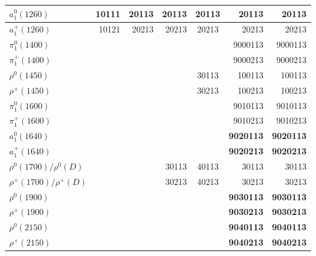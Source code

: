 \begin{tabular}{|l@{\tstrut}|r|r|r|c|r|r|}
$a_1^0(1260)$            & 10111 & 20113 &   20113 & 20113 &    20113 & 20113 \\ \hline
$a_1^+(1260)$            & 10121 & 20213 &   20213 & 20213 &    20213 & 20213 \\ \hline
$\pi_1^0(1400)$          &       &       &         &       &  9000113 & 9000113 \\ \hline
$\pi_1^+(1400)$          &       &       &         &       &  9000213 & 9000213 \\ \hline
$\rho^0(1450)$           &       &       &         & 30113 &   100113 & 100113 \\ \hline
$\rho^+(1450)$           &       &       &         & 30213 &   100213 & 100213 \\ \hline
$\pi_1^0(1600)$          &       &       &         &       &  9010113 & 9010113 \\ \hline
$\pi_1^+(1600)$          &       &       &         &       &  9010213 & 9010213 \\ \hline
$a_1^0(1640)$            &       &       &         &       & \bf{9020113} & \bf{9020113} \\ \hline
$a_1^+(1640)$            &       &       &         &       & \bf{9020213} & \bf{9020213} \\ \hline
$\rho^0(1700)/\rho^0(D)$ &       &       &   30113 & 40113 &    30113 & 30113 \\ \hline
$\rho^+(1700)/\rho^+(D)$ &       &       &   30213 & 40213 &    30213 & 30213 \\ \hline
$\rho^0(1900)$           &       &       &         &       & \bf{9030113} & \bf{9030113} \\ \hline
$\rho^+(1900)$           &       &       &         &       & \bf{9030213} & \bf{9030213} \\ \hline
$\rho^0(2150)$           &       &       &         &       & \bf{9040113} & \bf{9040113} \\ \hline
$\rho^+(2150)$           &       &       &         &       & \bf{9040213} & \bf{9040213} \\ \hline
\end{tabular}

